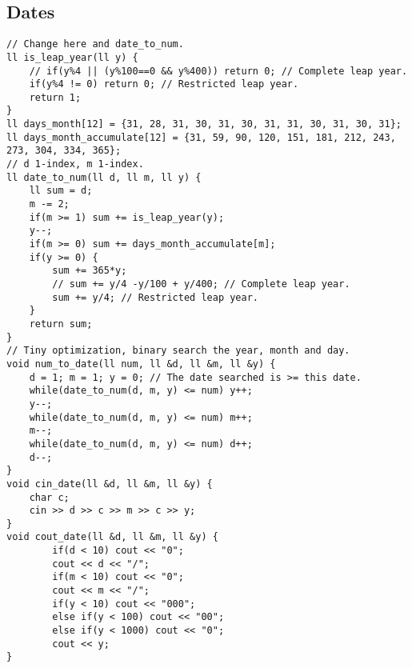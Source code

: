 \documentclass[a4paper]{article}
\begin{document}
\subsection*{Dates}
\begin{verbatim}
// Change here and date_to_num.
ll is_leap_year(ll y) {
    // if(y%4 || (y%100==0 && y%400)) return 0; // Complete leap year.
    if(y%4 != 0) return 0; // Restricted leap year.
    return 1;
}
ll days_month[12] = {31, 28, 31, 30, 31, 30, 31, 31, 30, 31, 30, 31};
ll days_month_accumulate[12] = {31, 59, 90, 120, 151, 181, 212, 243, 273, 304, 334, 365};
// d 1-index, m 1-index.
ll date_to_num(ll d, ll m, ll y) {
    ll sum = d;
    m -= 2;
    if(m >= 1) sum += is_leap_year(y);
    y--;
    if(m >= 0) sum += days_month_accumulate[m];
    if(y >= 0) {
        sum += 365*y;
        // sum += y/4 -y/100 + y/400; // Complete leap year.
        sum += y/4; // Restricted leap year.
    } 
    return sum;
}
// Tiny optimization, binary search the year, month and day.
void num_to_date(ll num, ll &d, ll &m, ll &y) {
    d = 1; m = 1; y = 0; // The date searched is >= this date.
    while(date_to_num(d, m, y) <= num) y++;
    y--;
    while(date_to_num(d, m, y) <= num) m++;
    m--;
    while(date_to_num(d, m, y) <= num) d++;
    d--;
}
void cin_date(ll &d, ll &m, ll &y) {
    char c;
    cin >> d >> c >> m >> c >> y;
}
void cout_date(ll &d, ll &m, ll &y) {
        if(d < 10) cout << "0";
        cout << d << "/";
        if(m < 10) cout << "0";
        cout << m << "/";
        if(y < 10) cout << "000";
        else if(y < 100) cout << "00";
        else if(y < 1000) cout << "0";
        cout << y;
}
\end{verbatim}
\end{document}

